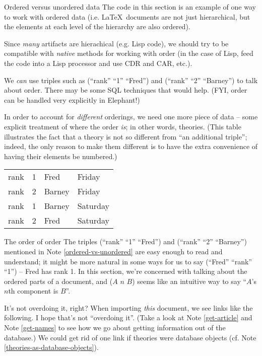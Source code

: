\begin{notate}{Ordered versus unordered data} \label{ordered-vs-unordered}
The code in this section is an example of one way to work
with ordered data (i.e. \LaTeX\ documents are not just
hierarchical, but the elements at each level of the
hierarchy are also ordered).

Since \emph{many} artifacts are hierachical (e.g. Lisp
code), we should try to be compatible with \emph{native}
methods for working with order (in the case of Lisp, feed
the code into a Lisp processor and use CDR and CAR, etc.).

We \emph{can} use triples such as (``rank'' ``1''
``Fred'') and (``rank'' ``2'' ``Barney'') to talk about
order.  There may be some SQL techniques that would help.
(FYI, order can be handled very explicitly in Elephant!)

In order to account for \emph{different} orderings, we
need one more piece of data -- some explicit treatment of
where the order \emph{is}; in other words, theories.
(This table illustrates the fact that a theory is not so
different from ``an additional triple''; indeed, the only
reason to make them different is to have the extra
convenience of having their elements be numbered.)

\begin{center}
\begin{tabular}{|lll|l|}
\hline
rank & 1 & Fred & Friday \\
rank & 2 & Barney & Friday \\
rank & 1 & Barney & Saturday \\
rank & 2 & Fred & Saturday \\
\hline
\end{tabular}
\end{center}
\end{notate}

\begin{notate}{The order of order} \label{order-of-order}
The triples (``rank'' ``1'' ``Fred'') and (``rank'' ``2''
``Barney'') mentioned in Note \ref{ordered-vs-unordered}
are easy enough to read and understand; it might be more
natural in some ways for us to say (``Fred'' ``rank''
``1'') -- Fred has rank 1.  In this section, we're
concerned with talking about the ordered parts of a
document, and ($A$ $n$ $B$) seems like an intuitive way to
say ``$A$'s $n$th component is $B$''.
\end{notate}

\begin{notate}{It's not overdoing it, right?}
When importing \emph{this} document, we see links like the
following.  I hope that's not ``overdoing it''.  (Take a
look at Note \ref{get-article} and Note \ref{get-names} to
see how we go about getting information out of the
database.)  We could get rid of one link if theories were
database objects (cf. Note
\ref{theories-as-database-objects}).
\end{notate}

